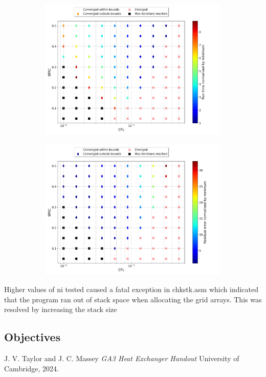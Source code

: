 \documentclass{article}
\begin{document}
\begin{figure}
    \centering
    \begin{subfigure}{0.49\textwidth}
        \includegraphics[width=0.99\textwidth]{figures/bump_cfl_sfac_time.png}
        \caption{}
        \label{fig:bump_time}
    \end{subfigure}
    \begin{subfigure}{0.49\textwidth}
        \includegraphics[width=0.99\textwidth]{figures/bump_cfl_sfac_residual.png}
        \caption{}
        \label{fig:bump_residual}
    \end{subfigure}
\end{figure}

Higher values of ni tested caused a fatal exception in chkstk.asm which indicated that the program ran out of stack space when allocating the grid arrays.
This was resolved by increasing the stack size 

\subsection{Objectives}


\begin{thebibliography}{9}

  J. V. Taylor and J. C. Massey
  \emph{GA3 Heat Exchanger Handout}
  University of Cambridge,
  2024.

\end{thebibliography}
\end{document}
